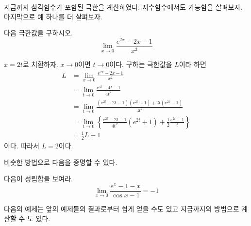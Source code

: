 \documentclass[11pt, a4paper]{book}
\begin{document}
	지금까지 삼각함수가 포함된 극한을 계산하였다. 지수함수에서도 가능함을 살펴보자. 마지막으로 예 하나를 더 살펴보자.
	\begin{example}
		다음 극한값을 구하시오.
		\begin{equation*}
				\displaystyle\lim_{x\to 0}\frac{e^{2x}-2x-1}{x^{2}}
		\end{equation*}
		\begin{solution}
		 $x = 2t$로 치환하자. $x\to 0$이면 $t\to 0$이다. 구하는 극한값을 $L$이라 하면
		\begin{align*}
			L& =\displaystyle\lim_{x\to 0}\frac{e^{2x}-2x-1}{x^{2}}\\
			& =\displaystyle\lim_{t\to 0}\frac{e^{4t}-4t-1}{4t^{2}}\\
			& =\displaystyle\lim_{t\to 0}\frac{(e^{2t}-2t-1)(e^{2t}+1)+ 2t(e^{2t}-1)}{4t^{2}}\\
			& =\displaystyle\lim_{t\to 0}\left\{\frac{e^{2t}-2t-1}{4t^{2}}\left(e^{2t}+1\right)+\frac{1}{2}\frac{e^{2t}-1}{t}\right\}\\
			& =\frac{1}{2}L + 1
		\end{align*}
		이다. 따라서 $L = 2$이다. 
		\end{solution}
	\end{example}
	비슷한 방법으로 다음을 증명할 수 있다.
\vspace{1em}
\begin{problem}
	 다음이 성립함을 보여라.
	\begin{equation*}
	\displaystyle\lim_{x\to 0}\frac{e^{x}-1-x}{\cos x -1}=-1
	\end{equation*}
\end{problem}
\vspace{1em}
	다음의 예제는 앞의 예제들의 결과로부터 쉽게 얻을 수도 있고 지금까지의 방법으로 계산할 수 도 있다.
\vspace{1em}
\end{document}
